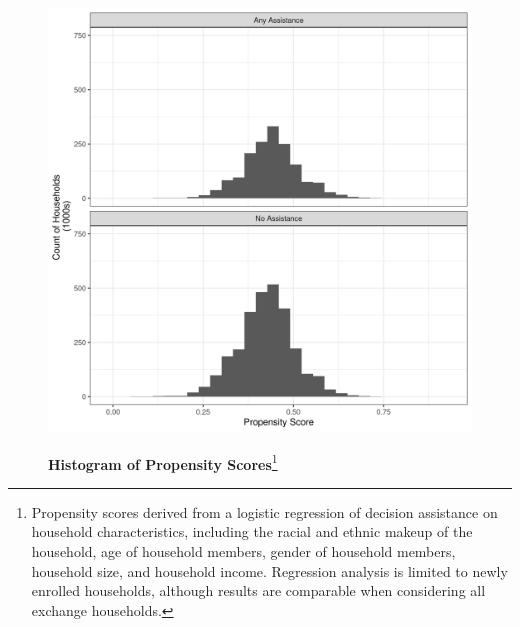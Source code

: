 \documentclass[12pt]{article}
\begin{document}
\newpage
\begin{figure}[htb]
\centering
\footnotesize
\begin{minipage}[h]{6in}
\caption[caption]{\textbf{Histogram of Propensity Scores}\footnote{Propensity scores derived from a logistic regression of decision assistance on household characteristics, including the racial and ethnic makeup of the household, age of household members, gender of household members, household size, and household income. Regression analysis is limited to newly enrolled households, although results are comparable when considering all exchange households.}}
\centerline{%
    \includegraphics[scale=0.75]{figures/ps_assist_clean.png}
}
\label{fig:ps-balance}
\end{minipage}
\end{figure}
\end{document}
